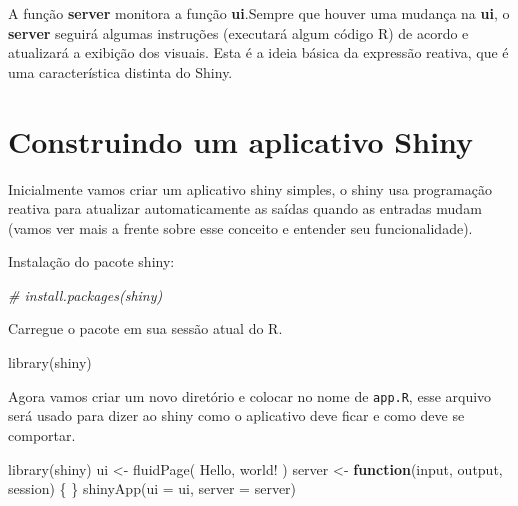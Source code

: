 \documentclass[
]{book}
\newenvironment{Shaded}{\begin{snugshade}}{\end{snugshade}}
\newcommand{\AttributeTok}[1]{\textcolor[rgb]{0.77,0.63,0.00}{#1}}
\newcommand{\CommentTok}[1]{\textcolor[rgb]{0.56,0.35,0.01}{\textit{#1}}}
\newcommand{\ControlFlowTok}[1]{\textcolor[rgb]{0.13,0.29,0.53}{\textbf{#1}}}
\newcommand{\FunctionTok}[1]{\textcolor[rgb]{0.00,0.00,0.00}{#1}}
\newcommand{\NormalTok}[1]{#1}
\newcommand{\OtherTok}[1]{\textcolor[rgb]{0.56,0.35,0.01}{#1}}
\newcommand{\StringTok}[1]{\textcolor[rgb]{0.31,0.60,0.02}{#1}}
\begin{document}
A função \textbf{server} monitora a função \textbf{ui}.Sempre que houver uma mudança na \textbf{ui}, o \textbf{server} seguirá algumas instruções (executará algum código R) de acordo e atualizará a exibição dos visuais. Esta é a ideia básica da expressão reativa, que é uma característica distinta do Shiny.

\hypertarget{construindo-um-aplicativo-shiny}{%
\section{\texorpdfstring{\textbf{Construindo um aplicativo Shiny}}{Construindo um aplicativo Shiny}}\label{construindo-um-aplicativo-shiny}}

Inicialmente vamos criar um aplicativo shiny simples, o shiny usa programação reativa para atualizar automaticamente as saídas quando as entradas mudam (vamos ver mais a frente sobre esse conceito e entender seu funcionalidade).

Instalação do pacote shiny:

\begin{Shaded}
\begin{Highlighting}[]
\CommentTok{\# install.packages(\textquotesingle{}shiny\textquotesingle{})}
\end{Highlighting}
\end{Shaded}

Carregue o pacote em sua sessão atual do R.

\begin{Shaded}
\begin{Highlighting}[]
\FunctionTok{library}\NormalTok{(shiny)}
\end{Highlighting}
\end{Shaded}

Agora vamos criar um novo diretório e colocar no nome de \texttt{app.R}, esse arquivo será usado para dizer ao shiny como o aplicativo deve ficar e como deve se comportar.

\begin{Shaded}
\begin{Highlighting}[]
\FunctionTok{library}\NormalTok{(shiny)}
\NormalTok{ui }\OtherTok{\textless{}{-}} \FunctionTok{fluidPage}\NormalTok{(}
   \StringTok{\textquotesingle{}Hello, world!\textquotesingle{}}
\NormalTok{)}
\NormalTok{server }\OtherTok{\textless{}{-}} \ControlFlowTok{function}\NormalTok{(input, output, session) \{}
\NormalTok{\}}
\FunctionTok{shinyApp}\NormalTok{(}\AttributeTok{ui =}\NormalTok{ ui, }\AttributeTok{server =}\NormalTok{ server)}
\end{Highlighting}
\end{Shaded}
\end{document}
